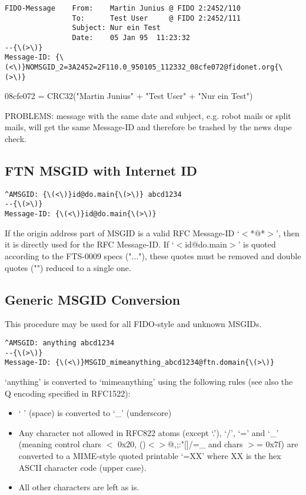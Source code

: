 \documentclass{article}
\begin{document}
\begin{verbatim}
FIDO-Message    From:    Martin Junius @ FIDO 2:2452/110 
                To:      Test User     @ FIDO 2:2452/111 
                Subject: Nur ein Test 
                Date:    05 Jan 95  11:23:32 
--{\(>\)} 
Message-ID: {\(<\)}NOMSGID_2=3A2452=2F110.0_950105_112332_08cfe072@fidonet.org{\(>\)} 
\end{verbatim}


08cfe072 = CRC32("Martin Junius" + "Test User" + "Nur ein Test")

PROBLEMS: message with the same date and subject, e.g. robot mails or split mails, will get the same Message-ID and therefore be trashed by the news dupe check. 


\subsection{FTN MSGID with Internet ID }

\begin{verbatim}
^AMSGID: {\(<\)}id@do.main{\(>\)} abcd1234 
--{\(>\)} 
Message-ID: {\(<\)}id@do.main{\(>\)} 
\end{verbatim}


If the origin address part of MSGID is a valid RFC Message-ID `{\(<\)}*@*{\(>\)}', then it is directly used for the RFC Message-ID. If `{\(<\)}id@do.main{\(>\)}' is quoted according to the FTS-0009 specs ("..."), these quotes must be removed and double quotes ("") reduced to a single one. 


\subsection{Generic MSGID Conversion }



This procedure may be used for all FIDO-style and unknown MSGIDs.   
\begin{verbatim}
^AMSGID: anything abcd1234 
--{\(>\)} 
Message-ID: {\(<\)}MSGID_mimeanything_abcd1234@ftn.domain{\(>\)} 
\end{verbatim}


`anything' is converted to `mimeanything' using the following rules (see also the Q encoding specified in RFC1522): 
\begin{itemize}
\item ` ' (space) is converted to `\_' (underscore)  
\item Any character not allowed in RFC822 atoms (except `.'), `/', `=' and `\_' (meaning control chars {\(<\)} 0x20, {\ttfamily (){\(<\)}{\(>\)}@,;:"[]/=\_} and chars {\(>\)}= 0x7f) are converted to a MIME-style quoted printable `=XX' where XX is the hex ASCII character code (upper case).  
\item All other characters are left as is.   
\end{itemize}
\end{document}
